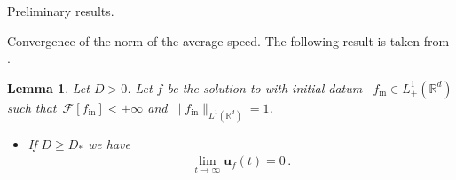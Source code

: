 \documentclass[reqno]{amsart} %
\newtheorem{lemma}{Lemma}[section]
\begin{document}
\begin{section}{Preliminary results.}
\begin{subsection}{Convergence of the norm of the average speed.}
\label{subsec:convavspeed}
The following result is taken from \cite{Li2021}. 
    \begin{lemma}
\label{lemmejfvois} Let $D>0$.
     Let $f$ be the solution to  with initial datum ~$f_{\mathrm{in}} \in L^1_+(\mathbb{R}^d)$ such \mbox{that~$\mathcal{F}[f_{\mathrm{in}}]<+\infty$} and  $\| f_{\mathrm{in}}\|_{L^1(\mathbb{R}^d)}=1$. 
     \\
\begin{itemize}
    \item      If $D\geq D_*$ we have
 \begin{align*}
         \lim_{t \rightarrow{\infty}}\mathbf{u}_{f}(t)=0\,.
         \end{align*}


\end{itemize}
\end{lemma}
\end{subsection}
\end{section}
\end{document}

